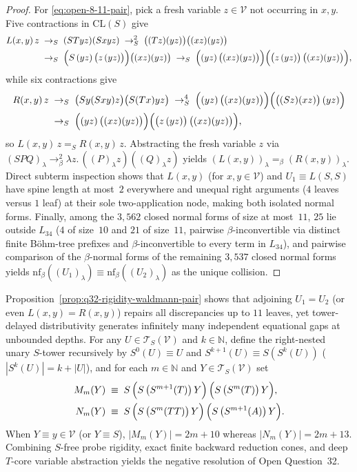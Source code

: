 \documentclass[11pt,reqno]{amsart}
\numberwithin{equation}{section}
\theoremstyle{plain}
\theoremstyle{definition}
\theoremstyle{remark}
\newcommand{\CLS}{\mathrm{CL}(S)}
\newcommand{\TSV}{\mathcal{T}_S(\mathcal{V})}
\newcommand{\redS}{\to_S}
\newcommand{\convS}{=_S}
\begin{document}
\begin{proof}
For \eqref{eq:open-8-11-pair}, pick a fresh variable $z \in \mathcal{V}$ not occurring in $x, y$. Five contractions in $\CLS$ give
\begin{align*}
  L(x, y)\,z &\;\redS\; (S T y z)(S x y z) \;\redS^2\; \bigl((T z)(y z)\bigr)\bigl((x z)(y z)\bigr) \\
  &\;\redS\; \Bigl(S\,(y z)\,\bigl(z\,(y z)\bigr)\Bigr)\bigl((x z)(y z)\bigr) \;\redS\; \Bigl((y z)\,\bigl((x z)(y z)\bigr)\Bigr)\Bigl(\bigl(z\,(y z)\bigr)\,\bigl((x z)(y z)\bigr)\Bigr),
\end{align*}
while six contractions give
\begin{align*}
  R(x, y)\,z &\;\redS\; \bigl(S y (S x y) z\bigr)\bigl(S(T x) y z\bigr) \;\redS^4\; \Bigl((y z)\,\bigl((x z)(y z)\bigr)\Bigr)\Bigl(\bigl((S z)(x z)\bigr)\,(y z)\Bigr) \\
  &\;\redS\; \Bigl((y z)\,\bigl((x z)(y z)\bigr)\Bigr)\Bigl(\bigl(z\,(y z)\bigr)\,\bigl((x z)(y z)\bigr)\Bigr),
\end{align*}
so $L(x, y)\,z \convS R(x, y)\,z$. Abstracting the fresh variable $z$ via $(S P Q)_\lambda \to_\beta^2 \lambda z.\, ((P)_\lambda z)((Q)_\lambda z)$ yields $(L(x, y))_\lambda =_\beta (R(x, y))_\lambda$. Direct subterm inspection shows that $L(x, y)$ (for $x, y \in \mathcal{V}$) and $U_1 \equiv L(S, S)$ have spine length at most~$2$ everywhere and unequal right arguments ($4$ leaves versus $1$ leaf) at their sole two-application node, making both isolated normal forms. Finally, among the $3{,}562$ closed normal forms of size at most~$11$, $25$ lie outside $L_{34}$ ($4$ of size~$10$ and $21$ of size~$11$, pairwise $\beta$-inconvertible via distinct finite B\"ohm-tree prefixes and $\beta$-inconvertible to every term in $L_{34}$), and pairwise comparison of the $\beta$-normal forms of the remaining $3{,}537$ closed normal forms yields $\mathrm{nf}_\beta((U_1)_\lambda) \equiv \mathrm{nf}_\beta((U_2)_\lambda)$ as the unique collision.
\end{proof}

Proposition~\ref{prop:q32-rigidity-waldmann-pair} shows that adjoining $U_1 = U_2$ (or even $L(x, y) = R(x, y)$) repairs all discrepancies up to $11$ leaves, yet tower-delayed distributivity generates infinitely many independent equational gaps at unbounded depths. For any $U \in \TSV$ and $k \in \mathbb{N}$, define the right-nested unary $S$-tower recursively by $S^0(U) \equiv U$ and $S^{k+1}(U) \equiv S(S^k(U))$ ($|S^k(U)| = k + |U|$), and for each $m \in \mathbb{N}$ and $Y \in \TSV$ set
\begin{equation}\label{eq:q32-mm-nm}
\begin{aligned}
  M_m(Y) &\;\equiv\; S\,\Bigl(S\,\bigl(S^{m+1}(T)\bigr)\,Y\Bigr)\,\Bigl(S\,\bigl(S^m(T)\bigr)\,Y\Bigr), \\
  N_m(Y) &\;\equiv\; S\,\Bigl(S\,\bigl(S^m(T T)\bigr)\,Y\Bigr)\,\Bigl(S\,\bigl(S^{m+1}(A)\bigr)\,Y\Bigr).
\end{aligned}
\end{equation}
When $Y \equiv y \in \mathcal{V}$ (or $Y \equiv S$), $|M_m(Y)| = 2m + 10$ whereas $|N_m(Y)| = 2m + 13$. Combining $S$-free probe rigidity, exact finite backward reduction cones, and deep $T$-core variable abstraction yields the negative resolution of Open Question~32.
\end{document}
